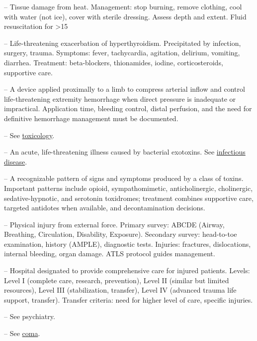 -- Tissue damage from heat. Management: stop burning, remove clothing, cool with water (not ice), cover with sterile dressing. Assess depth and extent. Fluid resuscitation for >15%

-- Life-threatening exacerbation of hyperthyroidism. Precipitated by infection, surgery, trauma. Symptoms: fever, tachycardia, agitation, delirium, vomiting, diarrhea. Treatment: beta-blockers, thionamides, iodine, corticosteroids, supportive care.

-- A device applied proximally to a limb to compress arterial inflow and control life-threatening extremity hemorrhage when direct pressure is inadequate or impractical. Application time, bleeding control, distal perfusion, and the need for definitive hemorrhage management must be documented.

-- See \hyperlink{Toxicology}{toxicology}.

-- An acute, life-threatening illness caused by bacterial exotoxins. See \hyperlink{Infectious Disease}{infectious disease}.

-- A recognizable pattern of signs and symptoms produced by a class of toxins. Important patterns include opioid, sympathomimetic, anticholinergic, cholinergic, sedative-hypnotic, and serotonin toxidromes; treatment combines supportive care, targeted antidotes when available, and decontamination decisions.

-- Physical injury from external force. Primary survey: ABCDE (Airway, Breathing, Circulation, Disability, Exposure). Secondary survey: head-to-toe examination, history (AMPLE), diagnostic tests. Injuries: fractures, dislocations, internal bleeding, organ damage. ATLS protocol guides management.

-- Hospital designated to provide comprehensive care for injured patients. Levels: Level I (complete care, research, prevention), Level II (similar but limited resources), Level III (stabilization, transfer), Level IV (advanced trauma life support, transfer). Transfer criteria: need for higher level of care, specific injuries.

-- See psychiatry.

-- See \hyperlink{Coma}{coma}.

